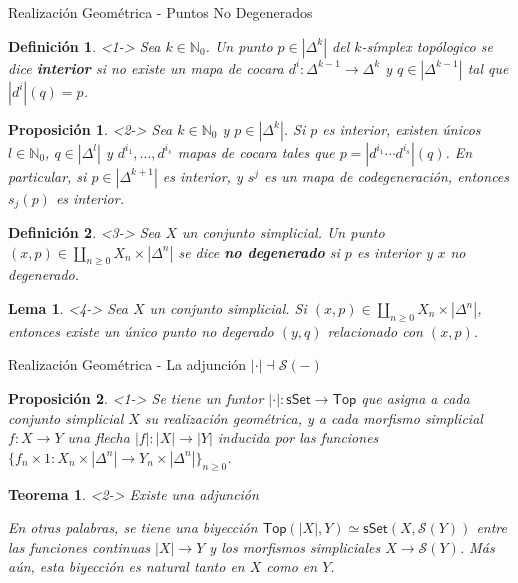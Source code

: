 \documentclass[11pt]{beamer}
\newcommand{\N}{\mathbb{N}}
\newcommand{\cat}[1]{\mathsf{#1}}
\renewcommand{\ss}[1]{\Delta^{#1}}
\newtheorem{defs}{Definición}
\newtheorem{teo}{Teorema}
\newtheorem{prop}{Proposición}
\newtheorem{lema}{Lema}
\begin{document}
\begin{frame}{Realización Geométrica - Puntos No Degenerados}
\begin{defs} <1-> Sea $k \in \N_0$. Un punto $p \in |\ss{k}|$ del $k$-símplex topólogico se dice \textbf{interior} si no existe un mapa de cocara $d^i : \ss{k-1} \to \ss{k}$ y $q \in |\ss{k-1}|$ tal que $|d^i|(q) = p$.
\end{defs}

\begin{prop} <2-> Sea $k \in \N_0$ y $p \in |\ss{k}|$. Si $p$ es interior, existen únicos $l \in \N_0$, $q \in |\ss{l}|$ y $d^{i_1}, \dots, d^{i_s}$ mapas de cocara tales que $p = |d^{i_1} \cdots d^{i_s}|(q)$. En particular, si $p \in |\ss{k+1}|$ es interior, y $s^j$ es un mapa de codegeneración, entonces $s_j(p)$ es interior. 
\end{prop}

\begin{defs} <3-> Sea $X$ un conjunto simplicial. Un punto $(x,p) \in \coprod_{n \geq 0} X_n \times |\ss{n}|$ se dice \textbf{no degenerado} si $p$ es interior y $x$ no degenerado.
\end{defs}

\begin{lema} <4-> Sea $X$ un conjunto simplicial. Si $(x,p) \in \coprod_{n \geq 0} X_n \times |\ss{n}|$, entonces existe un único punto no degerado $(y,q)$ relacionado con $(x,p)$.
\end{lema}
\end{frame}

\begin{frame}{Realización Geométrica - La adjunción $| \cdot | \dashv \mathscr{S}(-)$}
\begin{prop} <1-> Se tiene un funtor  $| \cdot | : \cat{sSet} \to \cat{Top}$ que asigna a cada conjunto simplicial $X$ su realización geométrica, y a cada morfismo simplicial $f : X \to Y$ una flecha $|f| : |X| \to |Y|$ inducida por las funciones $\{f_n \times 1 : X_n \times |\ss{n}| \to Y_n \times |\ss{n}|\}_{n\geq 0}$.
\end{prop}


\begin{teo} <2-> Existe una adjunción
\begin{center}
\end{center}
En otras palabras, se tiene una biyección $\cat{Top}(|X|,Y) \simeq \cat{sSet}(X,\mathscr{S}(Y))$ entre las funciones continuas $|X| \to Y$ y los morfismos simpliciales $X \to \mathscr{S}(Y)$. Más aún, esta biyección es natural tanto en $X$ como en $Y$.
\end{teo}
\end{frame}
\end{document}
